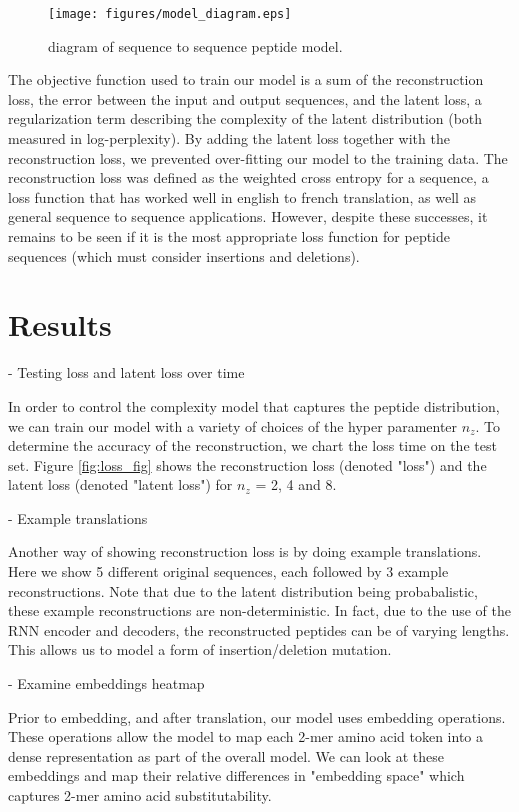 \documentclass[preprint,12pt]{elsarticle}
\begin{document}
\begin{figure}
  \centering
  \texttt{[image: figures/model\_diagram.eps]}
  \caption{diagram of sequence to sequence peptide model.}
  \label{model_diagram}
\end{figure}

The objective function used to train our model is a sum of the reconstruction loss, the error between the input and output sequences, and the latent loss, a regularization term describing the complexity of the latent distribution (both measured in log-perplexity). By adding the latent loss together with the reconstruction loss, we prevented over-fitting our model to the training data. The reconstruction loss was defined as the weighted cross entropy for a sequence, a loss function that has worked well in english to french translation, as well as general sequence to sequence applications\cite{vinyals2015grammar}. However, despite these successes, it remains to be seen if it is the most appropriate loss function for peptide sequences (which must consider insertions and deletions).

\section{Results}

- Testing loss and latent loss over time

In order to control the complexity model that captures the peptide distribution, we can train our model with a variety of choices of the hyper paramenter $n_z$. To determine the accuracy of the reconstruction, we chart the loss time on the test set. Figure \ref{fig:loss_fig} shows the reconstruction loss (denoted "loss") and the latent loss (denoted "latent loss") for $n_z$ = 2, 4 and 8.

- Example translations

Another way of showing reconstruction loss is by doing example translations. Here we show 5 different original sequences, each followed by 3 example reconstructions. Note that due to the latent distribution being probabalistic, these example reconstructions are non-deterministic. In fact, due to the use of the RNN encoder and decoders, the reconstructed peptides can be of varying lengths. This allows us to model a form of insertion/deletion mutation.

- Examine embeddings heatmap

Prior to embedding, and after translation, our model uses embedding operations. These operations allow the model to map each 2-mer amino acid token into a dense representation as part of the overall model. We can look at these embeddings and map their relative differences in "embedding space" which captures 2-mer amino acid substitutability.
\end{document}
